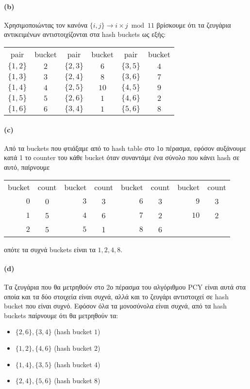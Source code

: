 \documentclass[a4paper,11pt]{article}
\begin{document}
\paragraph{(b)} Χρησιμοποιώντας τον κανόνα $\{i,j\} \rightarrow i \times j \bmod 11$ βρίσκουμε ότι τα ζευγάρια αντικειμένων αντιστοιχίζονται στα hash buckets ως εξής:
\begin{center}
	\begin{tabular}{| c | c || c | c || c | c |}
		\hline
		pair & bucket & pair & bucket & pair & bucket \\ \hhline{|=|=#=|=#=|=|}
		$\{1,2\}$ & $2$ & $\{2,3\}$ & $6$ & $\{3,5\}$ & $4$ \\ \hline
		$\{1,3\}$ & $3$ & $\{2,4\}$ & $8$ & $\{3,6\}$ & $7$ \\ \hline
		$\{1,4\}$ & $4$ & $\{2,5\}$ & $10$ & $\{4,5\}$ & $9$ \\ \hline
		$\{1,5\}$ & $5$ & $\{2,6\}$ & $1$ & $\{4,6\}$ & $2$ \\ \hline
		$\{1,6\}$ & $6$ & $\{3,4\}$ & $1$ & $\{5,6\}$ & $8$ \\ \hline
	\end{tabular}
\end{center}

\paragraph{(c)} Από τα buckets που φτιάξαμε από το hash table στο 1ο πέρασμα, εφόσον αυξάνουμε κατά 1 το counter του κάθε bucket όταν συναντάμε ένα σύνολο που κάνει hash σε αυτό, παίρνουμε
\begin{center}
	\begin{tabular}{| r | c || r | c || r | c || r | c |}
		\hline
		bucket & count & bucket & count & bucket & count & bucket & count \\
		\hhline{|=|=#=|=#=|=#=|=|}
		$0$ & 0 & $3$ & 3 & $6$ & 3 & $9$ & 3 \\ \hline
		$1$ & 5 & $4$ & 6 & $7$ & 2 & $10$ & 2 \\ \hline
		$2$ & 5 & $5$ & 1 & $8$ & 6 &  & \\ \hline
	\end{tabular}
\end{center}
οπότε τα συχνά buckets είναι τα $1,2,4,8$.

\paragraph{(d)} Τα ζευγάρια που θα μετρηθούν στο 2ο πέρασμα του αλγόριθμου PCY είναι αυτά στα οποία και τα δύο στοιχεία είναι συχνά, αλλά και το ζευγάρι αντιστοιχεί σε hash bucket που είναι συχνό.
Εφόσον όλα τα μονοσύνολα είναι συχνά, από τα hash buckets παίρνουμε ότι θα μετρηθούν τα:
\begin{itemize}
	\item $\{2,6\},\{3,4\}$ (hash bucket $1$)
	\item $\{1,2\},\{4,6\}$ (hash bucket $2$)
	\item $\{1,4\},\{3,5\}$ (hash bucket $4$)
	\item $\{2,4\},\{5,6\}$ (hash bucket $8$)
\end{itemize}
\end{document}
